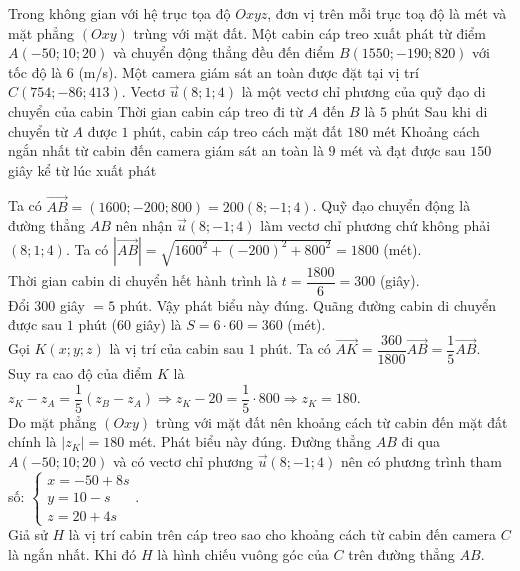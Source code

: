 \begin{ex}%
	Trong không gian với hệ trục tọa độ $Oxyz$, đơn vị trên mỗi trục toạ độ là mét và mặt phẳng $(Oxy)$ trùng với mặt đất. Một cabin cáp treo xuất phát từ điểm $A(-50;10;20)$ và chuyển động thẳng đều đến điểm $B(1550;-190;820)$ với tốc độ là $6$ (m/s). Một camera giám sát an toàn được đặt tại vị trí $C(754;-86;413)$.
	\choiceTF
	{Vectơ $\overrightarrow{u}(8;1;4)$ là một vectơ chỉ phương của quỹ đạo di chuyển của cabin}
	{\True Thời gian cabin cáp treo đi từ $A$ đến $B$ là $5$ phút}
	{\True Sau khi di chuyển từ $A$ được $1$ phút, cabin cáp treo cách mặt đất $180$ mét}
	{\True Khoảng cách ngắn nhất từ cabin đến camera giám sát an toàn là $9$ mét và đạt được sau $150$ giây kể từ lúc xuất phát}
	\loigiai
	{
		\begin{itemchoice}
			\itemch Ta có $\overrightarrow{AB}=(1600;-200;800)=200(8;-1;4)$. Quỹ đạo chuyển động là đường thẳng $AB$ nên nhận $\overrightarrow{u}(8;-1;4)$ làm vectơ chỉ phương chứ không phải $(8;1;4)$.
			\itemch Ta có $\left| \overrightarrow{AB}\right|=\sqrt{1600^2+(-200)^2+800^2}=1800$ (mét). \\
			Thời gian cabin di chuyển hết hành trình là $t=\dfrac{1800}{6}=300$ (giây).\\
			Đổi $300$ giây $= 5$ phút. Vậy phát biểu này đúng.
			\itemch Quãng đường cabin di chuyển được sau $1$ phút ($60$ giây) là $S = 6 \cdot 60 = 360$ (mét).\\
			Gọi $K(x;y;z)$ là vị trí của cabin sau $1$ phút. Ta có $\overrightarrow{AK} = \dfrac{360}{1800}\overrightarrow{AB} = \dfrac{1}{5}\overrightarrow{AB}$.\\
			Suy ra cao độ của điểm $K$ là $z_K - z_A = \dfrac{1}{5}(z_B - z_A) \Rightarrow z_K - 20 = \dfrac{1}{5} \cdot 800 \Rightarrow z_K = 180$.\\
			Do mặt phẳng $(Oxy)$ trùng với mặt đất nên khoảng cách từ cabin đến mặt đất chính là $|z_K|=180$ mét. Phát biểu này đúng.
			\itemch Đường thẳng $AB$ đi qua $A(-50; 10; 20)$ và có vectơ chỉ phương $\overrightarrow{u}(8; -1; 4)$ nên có phương trình tham số: $\begin{cases} x = -50 + 8s \\ y = 10 - s \\ z = 20 + 4s \end{cases}$.\\
			Giả sử $H$ là vị trí cabin trên cáp treo sao cho khoảng cách từ cabin đến camera $C$ là ngắn nhất. Khi đó $H$ là hình chiếu vuông góc của $C$ trên đường thẳng $AB$.\\

\end{itemchoice}}
\end{ex}
